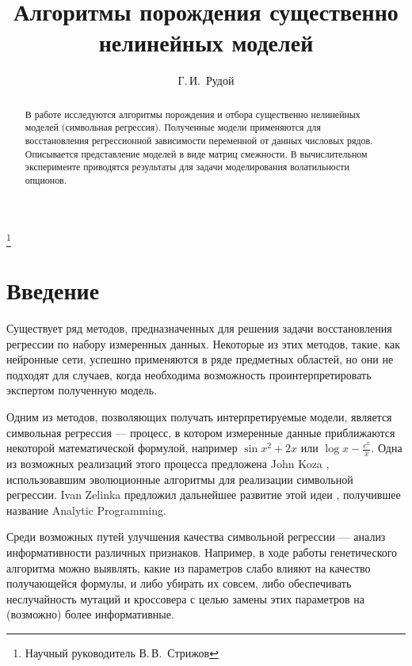 \documentclass[12pt,a4paper]{amsart}
\begin{document}
\pagestyle{plain}

\title{Алгоритмы порождения существенно нелинейных моделей}
\author{Г.\,И.~Рудой}
\address{Московский физико-технический институт, ФУПМ, каф. <<Интеллектуальные системы>>}
\thanks{Научный руководитель В.\,В.~Стрижов}

\begin{abstract}
  В работе исследуются алгоритмы порождения и отбора существенно нелинейных моделей (символьная регрессия). Полученные модели применяются для восстановления регрессионной зависимости переменной от данных числовых рядов. Описывается представление моделей в виде матриц смежности. В вычислительном эксперименте приводятся результаты для задачи моделирования волатильности опционов.
\end{abstract}

\maketitle

\section{Введение}

Существует ряд методов, предназначенных для решения задачи восстановления
регрессии по набору измеренных данных. Некоторые из этих методов, такие,
как нейронные сети, успешно применяются в ряде предметных областей, но они
не подходят для случаев, когда необходима возможность проинтерпретировать
экспертом полученную модель.

Одним из методов, позволяющих получать интерпретируемые модели, является
символьная регрессия --- процесс, в котором измеренные данные приближаются
некоторой математической формулой, например $ \sin x^2 + 2x $ или
$\log x - \frac{e^x}{x} $. Одна из возможных реализаций этого процесса
предложена John Koza \cite{Koza1998GP} \cite{Koza1998Intro}, использовавшим
эволюционные алгоритмы для реализации символьной регрессии. Ivan Zelinka
предложил дальнейшее развитие этой идеи \cite{Zelinka2008}, получившее
название Analytic Programming.

Среди возможных путей улучшения качества символьной регрессии --- анализ
информативности различных признаков. Например, в ходе работы генетического
алгоритма можно выявлять, какие из параметров слабо влияют на качество
получающейся формулы, и либо убирать их совсем, либо обеспечивать
неслучайность мутаций и кроссовера с целью замены этих параметров на
(возможно) более информативные.


\extrasrussian

\end{document}
